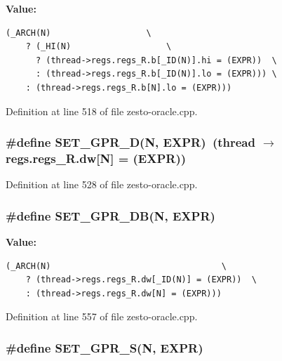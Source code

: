 \textbf{Value:}

\begin{Code}\begin{verbatim}(_ARCH(N)                   \
    ? (_HI(N)                   \
      ? (thread->regs.regs_R.b[_ID(N)].hi = (EXPR))  \
      : (thread->regs.regs_R.b[_ID(N)].lo = (EXPR))) \
    : (thread->regs.regs_R.b[N].lo = (EXPR)))
\end{verbatim}
\end{Code}


Definition at line 518 of file zesto-oracle.cpp.
\subsubsection[{SET\_\-GPR\_\-D}]{\setlength{\rightskip}{0pt plus 5cm}\#define SET\_\-GPR\_\-D(N, \/  EXPR)~(thread $\rightarrow$ regs.regs\_\-R.dw[N] = (EXPR))}\label{zesto-oracle_8cpp_f479882a574ad1c3e8028a799c3c031d}




Definition at line 528 of file zesto-oracle.cpp.
\subsubsection[{SET\_\-GPR\_\-DB}]{\setlength{\rightskip}{0pt plus 5cm}\#define SET\_\-GPR\_\-DB(N, \/  EXPR)}\label{zesto-oracle_8cpp_156362c48d8e9d87140ae34017f84c4a}


\textbf{Value:}

\begin{Code}\begin{verbatim}(_ARCH(N)                                  \
    ? (thread->regs.regs_R.dw[_ID(N)] = (EXPR))  \
    : (thread->regs.regs_R.dw[N] = (EXPR)))
\end{verbatim}
\end{Code}


Definition at line 557 of file zesto-oracle.cpp.
\subsubsection[{SET\_\-GPR\_\-S}]{\setlength{\rightskip}{0pt plus 5cm}\#define SET\_\-GPR\_\-S(N, \/  EXPR)}\label{zesto-oracle_8cpp_36c3c33eb0e30cbae3b64c6d0803eae4}


